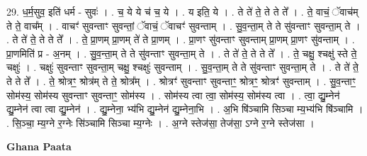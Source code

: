 \documentclass[17pt]{extarticle}
\begin{document}
29. ध॒र्म॒सुव॒ इति॑ धर्म - सुवः॑ । . च॒ ये ये च॑ च॒ ये । . य इति॒ ये । . ते ते॑ ते॒ ते ते ते᳚ । . ते॒ वाचं॒ ॅवाच॑म् ते ते॒ वाच᳚म् । . वाचꣳ॑ सुवन्ताꣳ सुवन्तां॒ ॅवाचं॒ ॅवाचꣳ॑ सुवन्ताम् । . सु॒व॒न्ता॒म् ते ते सु॑वन्ताꣳ सुवन्ता॒म् ते । . ते ते॑ ते॒ ते ते ते᳚ । . ते॒ प्रा॒णम् प्रा॒णम् ते॑ ते प्रा॒णम् । . प्रा॒णꣳ सु॑वन्ताꣳ सुवन्ताम् प्रा॒णम् प्रा॒णꣳ सु॑वन्ताम् । . प्रा॒णमिति॑ प्र - अ॒नम् । . सु॒व॒न्ता॒म् ते ते सु॑वन्ताꣳ सुवन्ता॒म् ते । . ते ते॑ ते॒ ते ते ते᳚ । . ते॒ चक्षु॒ श्चक्षु॑ स्ते ते॒ चक्षुः॑ । . चक्षुः॑ सुवन्ताꣳ सुवन्ता॒म् चक्षु॒ श्चक्षुः॑ सुवन्ताम् । . सु॒व॒न्ता॒म् ते ते सु॑वन्ताꣳ सुवन्ता॒म् ते । . ते ते॑ ते॒ ते ते ते᳚ । . ते॒ श्रोत्रꣳ॒॒ श्रोत्र॑म् ते ते॒ श्रोत्र᳚म् । . श्रोत्रꣳ॑ सुवन्ताꣳ सुवन्ताꣳ॒॒ श्रोत्रꣳ॒॒ श्रोत्रꣳ॑ सुवन्ताम् । . सु॒व॒न्ताꣳ॒॒ सोम॑स्य॒ सोम॑स्य सुवन्ताꣳ सुवन्ताꣳ॒॒ सोम॑स्य । . सोम॑स्य त्वा त्वा॒ सोम॑स्य॒ सोम॑स्य त्वा । . त्वा॒ द्यु॒म्नेन॑ द्यु॒म्नेन॑ त्वा त्वा द्यु॒म्नेन॑ । . द्यु॒म्नेना॒ भ्य॑भि द्यु॒म्नेन॑ द्यु॒म्नेना॒भि । . अ॒भि षि॑ञ्चामि सिञ्चा म्य॒भ्य॑भि षि॑ञ्चामि । . सि॒ञ्चा॒ म्य॒ग्ने र॒ग्नेः सि॑ञ्चामि सिञ्चा म्य॒ग्नेः । . अ॒ग्ने स्तेज॑सा॒ तेज॑सा॒ ऽग्ने र॒ग्ने स्तेज॑सा । \newline

\textbf{Ghana Paata } \newline
\end{document}
